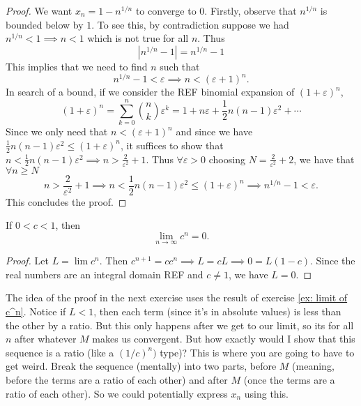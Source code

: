 \documentclass[../main.tex]{subfiles}
\begin{document}
\begin{proof} We want $x_n = 1 - n^{1/n}$ to converge to $0$. Firstly, observe that $n^{1/n}$ is bounded below by $1$. To see this, by contradiction suppose we had $n^{1/n} < 1 \implies n < 1$ which is not true for all $n$. Thus
\[
|n^{1/n} - 1| = n^{1/n} - 1
\]
This implies that we need to find $n$ such that \[
n^{1/n} - 1 < \varepsilon \implies n < (\varepsilon + 1)^n.
\]
In search of a bound, if we consider the REF binomial expansion of $(1+\varepsilon)^n$, 
\[
(1+\varepsilon)^n = \sum_{k=0}^{n}{\binom{n}{k}\varepsilon^k} = 1 + n\varepsilon + \frac{1}{2}n(n-1)\varepsilon^2 + \cdots 
\]
Since we only need that $n < (\varepsilon + 1)^n$ and since we have $\frac{1}{2}n(n-1)\varepsilon^2 \leq (1+\varepsilon)^n$,
it suffices to show that $n < \frac{1}{2}n(n-1)\varepsilon^2 \implies n > \frac{2}{\varepsilon^2} + 1$. Thus $\forall \varepsilon > 0$ choosing $N = \frac{2}{\varepsilon^2} + 2$, we have that $\forall n \geq N$
\[
n > \frac{2}{\varepsilon^2} + 1 \implies n < \frac{1}{2}n(n-1)\varepsilon^2 \leq (1+\varepsilon)^n \implies n^{1/n} - 1 < \varepsilon.
\]
This concludes the proof.

\end{proof}
    
    
    
    
    
    
    
    
    
    \begin{exercise} \label{ex: limit of c^n}
    If $0<c<1$, then 
        \[
        \lim_{n \to \infty} c^n = 0.
        \]
    \end{exercise}

\begin{proof}
Let $L = \lim{c^n}$. Then $c^{n+1} = cc^n \implies L = cL \implies 0 = L(1-c).$ Since the real numbers are an integral domain REF and $ c \neq 1$, we have $L = 0$. 
\end{proof}
    
    
    
    
    
    
    
    
    
    
    
    
    
    \begin{remark}
    The idea of the proof in the next exercise uses the result of exercise \ref{ex: limit of c^n}. Notice if \( L < 1\), then each term (since it's in absolute values) is less than the other by a ratio. But this only happens after we get to our limit, so its for all \(n\) after whatever \(M\) makes us convergent. But how exactly would I show that this sequence is a ratio (like a \((1/c)^n)\) type)? This is where you are going to have to get weird. Break the sequence (mentally) into two parts, before \(M\) (meaning, before the terms are a ratio of each other) and after \(M\) (once the terms are a ratio of each other). So we could potentially express \( x_n\) using this.
    \end{remark}
    
\end{document}
